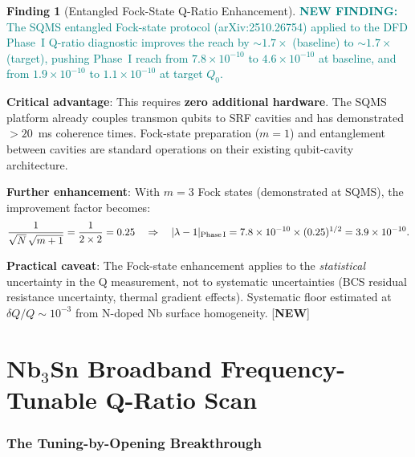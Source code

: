 \documentclass[11pt]{article}
\newcommand{\lam}{\lambda}
\newcommand{\ee}[1]{\times 10^{#1}}
\newcommand{\lbone}{|\lam - 1|}
\newcommand{\newfinding}[1]{\textcolor{teal}{\textbf{NEW FINDING:} #1}}
\theoremstyle{definition}
\newtheorem{finding}[theorem]{Finding}
\theoremstyle{remark}
\begin{document}
\begin{finding}[Entangled Fock-State Q-Ratio Enhancement]
\label{find:entangled}
\newfinding{The SQMS entangled Fock-state protocol (arXiv:2510.26754)
applied to the DFD Phase~I Q-ratio diagnostic improves the reach by
$\sim 1.7\times$ (baseline) to $\sim 1.7\times$ (target), pushing
Phase~I reach from $7.8\ee{-10}$ to $4.6\ee{-10}$ at baseline, and
from $1.9\ee{-10}$ to $1.1\ee{-10}$ at target $Q_0$.}

\textbf{Critical advantage}: This requires \textbf{zero additional
hardware}. The SQMS platform already couples transmon qubits to SRF
cavities and has demonstrated $>20$~ms coherence times. Fock-state
preparation ($m = 1$) and entanglement between cavities are standard
operations on their existing qubit-cavity architecture.

\textbf{Further enhancement}: With $m = 3$ Fock states (demonstrated
at SQMS), the improvement factor becomes:
\begin{equation}
\frac{1}{\sqrt{N}\,\sqrt{m+1}} = \frac{1}{2\times 2} = 0.25
\quad\Rightarrow\quad
\lbone_{\rm Phase\,I} = 7.8\ee{-10}\times (0.25)^{1/2} = 3.9\ee{-10}.
\end{equation}

\textbf{Practical caveat}: The Fock-state enhancement applies to the
\emph{statistical} uncertainty in the Q measurement, not to systematic
uncertainties (BCS residual resistance uncertainty, thermal gradient
effects). Systematic floor estimated at $\delta Q/Q \sim 10^{-3}$
from N-doped Nb surface homogeneity.
[\textbf{NEW}]
\end{finding}


\part{Nb$_3$Sn Broadband Frequency-Tunable Q-Ratio Scan}
\label{part:Nb3Sn}


\section{The Tuning-by-Opening Breakthrough}
\label{sec:tuning}
\end{document}
